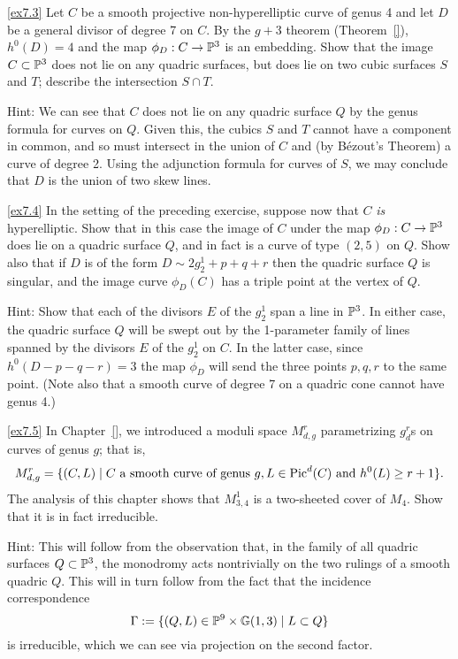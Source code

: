 \begin{exercise}\ref{ex7.3}
Let $C$  be a smooth projective non-hyperelliptic curve of genus 4 and let $D$ be a general divisor of degree 7 on $C$. By the $g+3$ theorem (Theorem~\ref{}), $h^0(D) = 4$ and the map $\phi_D : C \to \PP^3$ is an embedding. Show that the image $C \subset \PP^3$ does not lie on any quadric surfaces, but does lie on two cubic surfaces $S$ and $T$; describe the intersection $S \cap T$.
\end{exercise}

Hint: We can see that $C$ does not lie on any quadric surface $Q$ by the genus formula for curves on $Q$. Given this, the cubics $S$ and $T$ cannot have a component in common, and so must intersect in the union of $C$ and (by B\'ezout's Theorem) a curve of degree 2. Using the adjunction formula for curves of $S$, we may conclude that $D$ is the union of two skew lines.

\begin{exercise}\ref{ex7.4}
In the setting of the preceding exercise, suppose now that $C$ \emph{is} hyperelliptic. Show that in this case the image of $C$ under the map $\phi_D : C \to \PP^3$ does lie on a quadric surface $Q$, and in fact is a curve of type $(2,5)$ on $Q$. Show also that if $D$ is of the form $D \sim 2g^1_2 + p + q + r$ then the quadric surface $Q$ is singular, and the image curve $\phi_D(C)$ has a triple point at the vertex of $Q$.
\end{exercise}

Hint: Show that each of the divisors $E$ of the $g^1_2$ span a line in $\PP^3$. In either case, the quadric surface $Q$ will be swept out by the 1-parameter family of lines spanned by the divisors $E$ of the $g^1_2$ on $C$. In the latter case, since $h^0(D-p-q-r) = 3$ the map $\phi_D$ will send the three points $p, q, r$ to the same point. (Note also that a smooth curve of degree 7 on a quadric cone cannot have genus 4.)

\begin{exercise}\ref{ex7.5}
In Chapter~\ref{}, we introduced a moduli space $M^r_{d,g}$ parametrizing $g^r_d$s on curves of genus $g$; that is,
$$
M^r_{d,g} = \{ (C, L) \mid C \text{ a smooth curve of genus } g, L \in \pic^d(C) \text{ and } h^0(L) \geq r+1 \}.
$$
The analysis of this chapter shows that $M^1_{3,4}$ is a two-sheeted cover of $M_4$. Show that it is in fact irreducible.
\end{exercise}

Hint: This will follow from the observation that, in the family of all quadric surfaces $Q \subset \PP^3$, the monodromy acts nontrivially on the two rulings of a smooth quadric $Q$. This will in turn follow from the fact that the incidence correspondence
$$
\Gamma := \{ (Q, L) \in \PP^9 \times \GG(1,3) \mid L \subset Q \}
$$
is irreducible, which we can see via projection on the second factor.

